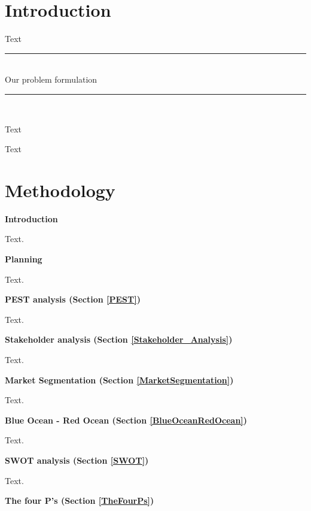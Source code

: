 \documentclass[12p]{article}
\newcommand{\SlimHRule}{\rule{\linewidth}{0.25mm}} %
\begin{document}

\section{Introduction}

Text

\begin{center}
    \vspace{1em}
    \SlimHRule\\[0.1cm]
    \Large{Our problem formulation}
    \SlimHRule\\[0.1cm]
    \vspace{1em}
\end{center}

Text \medskip

Text


\newpage
\section{Methodology} \label{Methodology}

\textbf{Introduction}

Text. \medskip

\textbf{Planning}

Text. \medskip

\textbf{PEST analysis (Section \ref{PEST})}

Text. \medskip

\textbf{Stakeholder analysis (Section \ref{Stakeholder_Analysis})}

Text. \medskip

\textbf{Market Segmentation (Section \ref{MarketSegmentation})}

Text. \medskip

\textbf{Blue Ocean - Red Ocean (Section \ref{BlueOceanRedOcean})}

Text. \medskip

\textbf{SWOT analysis (Section \ref{SWOT})}

Text. \medskip

\textbf{The four P's (Section \ref{TheFourPs})}
\end{document}
